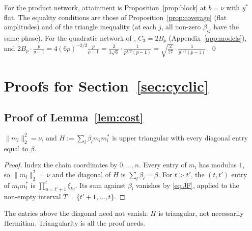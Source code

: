 For the product network, attainment is Proposition~\ref{prop:block} at $b=\nu$ with $y^*$ flat. The equality conditions are those of Proposition~\ref{prop:coverage} (flat amplitudes) and of the triangle inequality (at each $j$, all non-zero $\beta_{ij}$ have the same phase). For the quadratic network of \citet{morwani2024feature}, $C_3=2B_p$ (Appendix~\ref{app:models}), and $2B_p\cdot\frac p{p-1}=4(6p)^{-3/2}\frac p{p-1}=\frac{2}{3\sqrt6}\cdot\frac1{p^{1/2}(p-1)}=\sqrt{\frac2{27}}\cdot\frac1{p^{1/2}(p-1)}$.
\qed

\section{Proofs for Section~\ref{sec:cyclic}}\label{app:cyclic}

\subsection{Proof of Lemma~\ref{lem:cost}}\label{app:cost}

\begin{lemma}\label{lem:chain}
$\|m_l\|_2^2=\nu$, and $H:=\sum_l\beta_lm_lm_l^*$ is upper triangular with every diagonal entry equal to $\beta$.
\end{lemma}
\begin{proof}
Index the chain coordinates by $0,\dots,n$. Every entry of $m_l$ has modulus $1$, so $\|m_l\|_2^2=\nu$ and the diagonal of $H$ is $\sum_l\beta_l=\beta$. For $t>t'$, the $(t,t')$ entry of $m_lm_l^*$ is $\prod_{u=t'+1}^{t}\xi_{lu}$. Its sum against $\beta_l$ vanishes by \eqref{eq:JF}, applied to the non-empty interval $T=\{t'+1,\dots,t\}$.
\end{proof}
The entries above the diagonal need not vanish: $H$ is triangular, not necessarily Hermitian. Triangularity is all the proof needs.

